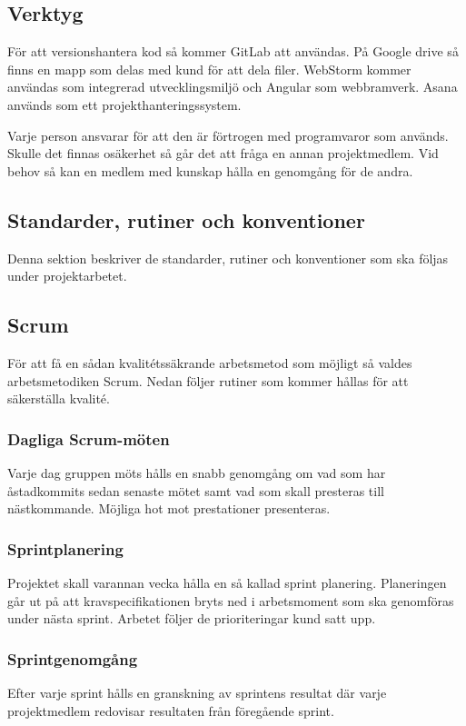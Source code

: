 \documentclass[a4paper,10pt]{article}
\begin{document}
\subsection{Verktyg}

För att versionshantera kod så kommer GitLab att användas. På Google drive så finns en mapp som delas med kund för att dela filer. WebStorm kommer användas som integrerad utvecklingsmiljö och Angular som webbramverk. Asana används som ett projekthanteringssystem.

Varje person ansvarar för att den är förtrogen med programvaror som används. Skulle det finnas osäkerhet så går det att fråga en annan projektmedlem. Vid behov så kan en medlem med kunskap hålla en genomgång för de andra.

\subsection{Standarder, rutiner och konventioner}
Denna sektion beskriver de standarder, rutiner och konventioner som ska följas under projektarbetet.

\subsection{Scrum}
\label{sec:Scrum}
För att få en sådan kvalitétssäkrande arbetsmetod som möjligt så valdes arbetsmetodiken Scrum. Nedan följer rutiner som kommer hållas för att säkerställa kvalité.

\subsubsection{Dagliga Scrum-möten}
Varje dag gruppen möts hålls en snabb genomgång om vad som har åstadkommits sedan senaste mötet samt vad som skall presteras till nästkommande. Möjliga hot mot prestationer presenteras.

\subsubsection{Sprintplanering}
Projektet skall varannan vecka hålla en så kallad sprint planering. Planeringen går ut på att kravspecifikationen bryts ned i arbetsmoment som ska genomföras under nästa sprint. Arbetet följer de prioriteringar kund satt upp.

\subsubsection{Sprintgenomgång}
Efter varje sprint hålls en granskning av sprintens resultat där varje projektmedlem redovisar resultaten från föregående sprint.
\end{document}
